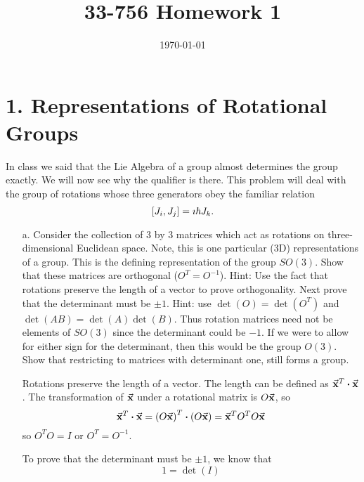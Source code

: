 \documentclass[a4paper,twoside]{article}
\title{33-756 Homework 1}
\date{\today}
\begin{document}
\maketitle

\section*{1. Representations of Rotational Groups}
In class we said that the Lie Algebra of a group almost determines the group exactly. We will now see why the qualifier is there. This problem will deal with the group of rotations whose three generators obey the familiar relation
\begin{equation}
    \comm{J_i}{J_j} = \imath \hbar J_k.
\end{equation}
\begin{itemize}
    \item[a.] Consider the collection of 3 by 3 matrices which act as rotations on three-dimensional Euclidean space. Note, this is one particular (3D) representations of a group. This is the defining representation of the group $ SO(3) $. Show that these matrices are orthogonal ($ O^T = O^{-1} $). Hint: Use the fact that rotations preserve the length of a vector to prove orthogonality. Next prove that the determinant must be $ \pm 1 $. Hint: use $ \det(O) = \det(O^T) $ and $ \det(AB) = \det(A)\det(B) $. Thus rotation matrices need not be elements of $ SO(3) $ since the determinant could be $ -1 $. If we were to allow for either sign for the determinant, then this would be the group $ O(3) $. Show that restricting to matrices with determinant one, still forms a group.
        \begin{problem}
            Rotations preserve the length of a vector. The length can be defined as $\va{ x}^T \vdot\va{ x} $. The transformation of $\va{ x} $ under a rotational matrix is $ O\va{ x} $, so
            \begin{equation}
                \va{ x}^T \vdot\va{ x} = \left( O\va{ x} \right)^T \vdot\left( O\va{ x} \right) =\va{ x}^T O^T O\va{ x}
            \end{equation}
            so $ O^T O = I $ or $ O^T = O^{-1} $.
        \end{problem}
        \begin{problem}
            To prove that the determinant must be $ \pm 1 $, we know that
            \begin{equation}
                1 = \det(I)
            \end{equation}

\end{problem}
\end{itemize}
\end{document}
